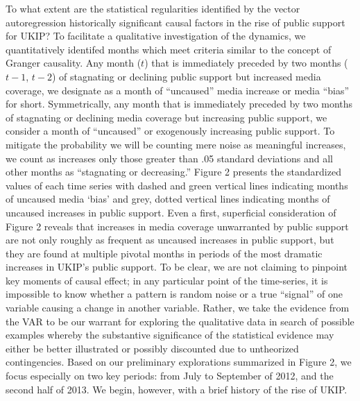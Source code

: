 \documentclass[12pt,article]{article}
\begin{document}
To what extent are the statistical regularities identified by the vector
autoregression historically significant causal factors in the rise of
public support for UKIP? To facilitate a qualitative investigation of
the dynamics, we quantitatively identifed months which meet criteria
similar to the concept of Granger causality. Any month (\(t\)) that is
immediately preceded by two months (\(t-1\), \(t-2\)) of stagnating or
declining public support but increased media coverage, we designate as a
month of ``uncaused'' media increase or media ``bias'' for short.
Symmetrically, any month that is immediately preceded by two months of
stagnating or declining media coverage but increasing public support, we
consider a month of ``uncaused'' or exogenously increasing public
support. To mitigate the probability we will be counting mere noise as
meaningful increases, we count as increases only those greater than .05
standard deviations and all other months as ``stagnating or
decreasing.'' Figure 2 presents the standardized values of each time
series with dashed and green vertical lines indicating months of
uncaused media `bias' and grey, dotted vertical lines indicating months
of uncaused increases in public support. Even a first, superficial
consideration of Figure 2 reveals that increases in media coverage
unwarranted by public support are not only roughly as frequent as
uncaused increases in public support, but they are found at multiple
pivotal months in periods of the most dramatic increases in UKIP's
public support. To be clear, we are not claiming to pinpoint key moments
of causal effect; in any particular point of the time-series, it is
impossible to know whether a pattern is random noise or a true
``signal'' of one variable causing a change in another variable. Rather,
we take the evidence from the VAR to be our warrant for exploring the
qualitative data in search of possible examples whereby the substantive
significance of the statistical evidence may either be better
illustrated or possibly discounted due to untheorized contingencies.
Based on our preliminary explorations summarized in Figure 2, we focus
especially on two key periods: from July to September of 2012, and the
second half of 2013. We begin, however, with a brief history of the rise
of UKIP.
\end{document}
